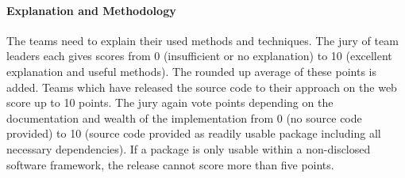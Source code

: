 \documentclass[12pt,twoside]{article}
\begin{document}
\vspace{-2ex}\paragraph{Explanation and Methodology}
%
The teams need to explain their used methods and techniques. The jury
of team leaders each gives scores from 0 (insufficient or no
explanation) to 10 (excellent explanation and useful methods). The
rounded up average of these points is added. Teams which have released
the source code to their approach on the web score up to 10
points. The jury again vote points depending on the documentation and
wealth of the implementation from 0 (no source code provided) to 10
(source code provided as readily usable package including all
necessary dependencies). If a package is only usable within a
non-disclosed software framework, the release cannot score more than
five points.
%
%
%
%
\end{document}
